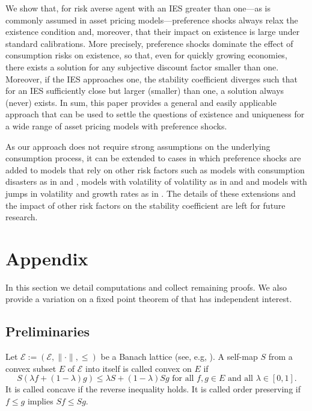 \documentclass[12pt, reqno]{amsart}
\renewcommand{\leq}{\leqslant}
\newcommand{\1}{\mathbbm 1}
\newcommand{\eE}{\mathcal E}
\theoremstyle{plain}
\theoremstyle{definition}
\begin{document}
We show that, for risk averse agent with an IES greater than one---as is
commonly assumed in asset pricing models---preference shocks always relax the
existence condition and, moreover, that their impact on existence is large under
standard calibrations.  More precisely, preference
shocks dominate the effect of consumption risks on existence, so that, even for
quickly growing economies, there exists a solution for any subjective discount
factor smaller than one.  Moreover, if the IES approaches one, the stability
coefficient diverges such that for an IES sufficiently close but larger
(smaller) than one, a solution always (never) exists. In sum, this paper
provides a general and easily applicable approach that can be used to settle
the questions of existence and uniqueness for a wide range of asset pricing
models with preference shocks.

As our approach does not require strong assumptions on the underlying
consumption process, it can be extended to cases in which preference shocks
are added to models that rely on other risk factors such as models with
consumption disasters as in \cite{Barro2009} and \cite{Wachter2013}, models
with volatility of volatility as in \cite{Bollerslev2009} and
\cite{Bollerslevetal2015} and models with jumps in volatility and growth rates
as in \cite{DrechslerYaron11}.  The details of these extensions and the impact
of other risk factors on the stability coefficient are left for future
research.





\section{Appendix}

In this section we detail computations and collect remaining proofs.
We also provide a variation on a fixed point theorem of \cite{du1990fixed} that has
independent interest.

\subsection{Preliminaries}


Let $\eE := (\eE, \| \cdot \|, \leq)$ be a Banach lattice (see, e.g,
\cite{meyer2012banach}).  A self-map $S$ from a convex subset $E$ of $\eE$
into itself is called convex on $E$ if 
%
\begin{equation*}
    S (\lambda f + (1-\lambda) g) \leq \lambda S + (1-\lambda) S g
    \text{ for all }
    f,g \in E
    \text{ and all }
    \lambda \in [0,1].   
\end{equation*}
%
It is called concave if the reverse inequality holds. It is called order
preserving if $f \leq g$ implies $Sf \leq Sg$.
\end{document}
